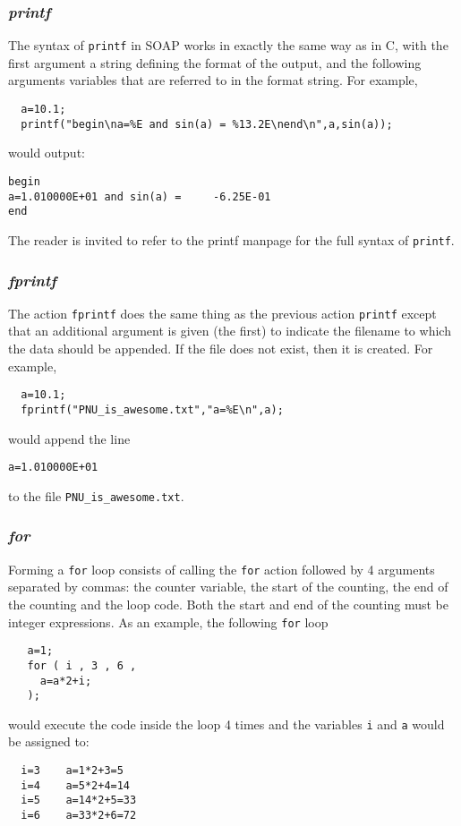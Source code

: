 \documentclass{warpdoc}
\begin{document}
\subsubsection{\emph{printf}}

The syntax of \verb|printf| in
SOAP works in exactly the same way as in C, with the first argument a string
defining the format of the output, and the following arguments variables
that are referred to in the format string. For example,
%
\begin{verbatim}
  a=10.1;
  printf("begin\na=%E and sin(a) = %13.2E\nend\n",a,sin(a));
\end{verbatim}
%
would output:
%
\begin{verbatim}
begin
a=1.010000E+01 and sin(a) =     -6.25E-01
end
\end{verbatim}
%
The reader is invited to refer to the printf manpage for the full syntax of \verb|printf|.


\subsubsection{\emph{fprintf}}

The action \verb|fprintf| does the same thing as the previous action \verb|printf| except
that an additional argument is given (the first) to indicate the filename to which
the data should be appended. If the file does not exist, then it is created.
 For example,
%
\begin{verbatim}
  a=10.1;
  fprintf("PNU_is_awesome.txt","a=%E\n",a);
\end{verbatim}
%
would append the line
%
\begin{verbatim}
a=1.010000E+01
\end{verbatim}
%
to the file \verb|PNU_is_awesome.txt|.


\subsubsection{\emph{for}}

Forming a \verb|for| loop consists of calling the \verb|for|
action followed by 4 arguments separated by commas: the counter variable, the start of
the counting, the end of the counting and the loop code. Both
the start and end of the counting must be integer expressions.
As an example, the following \verb|for| loop
%
\begin{verbatim}
   a=1;
   for ( i , 3 , 6 ,
     a=a*2+i;
   );
\end{verbatim}
%
would execute the code inside the loop 4 times and the variables
\verb|i| and \verb|a| would be assigned to:
%
\begin{verbatim}
  i=3    a=1*2+3=5
  i=4    a=5*2+4=14
  i=5    a=14*2+5=33
  i=6    a=33*2+6=72
\end{verbatim}
%
\end{document}
